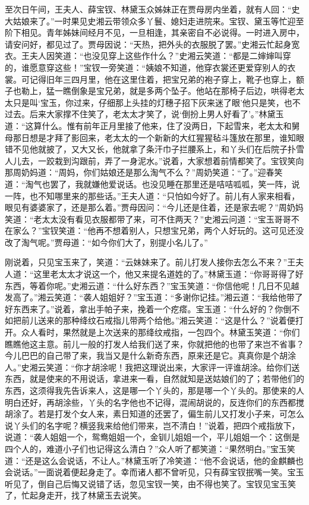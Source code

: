 \documentclass[12pt,oneside]{book}
\begin{document}
至次日午间，王夫人、薛宝钗、林黛玉众姊妹正在贾母房内坐着，就有人回：“史大姑娘来了。”一时果见史湘云带领众多丫鬟、媳妇走进院来。宝钗、黛玉等忙迎至阶下相见。青年姊妹间经月不见，一旦相逢，其亲密自不必说得。一时进入房中，请安问好，都见过了。贾母因说：“天热，把外头的衣服脱了罢。”史湘云忙起身宽衣。王夫人因笑道：“也没见穿上这些作什么？”史湘云笑道：“都是二婶婶叫穿的，谁愿意穿这些！”宝钗一旁笑道：“姨娘不知道，他穿衣裳还更爱穿别人的衣裳。可记得旧年三四月里，他在这里住着，把宝兄弟的袍子穿上，靴子也穿上，额子也勒上，猛一瞧倒象是宝兄弟，就是多两个坠子。他站在那椅子后边，哄得老太太只是叫‘宝玉，你过来，仔细那上头挂的灯穗子招下灰来迷了眼’他只是笑，也不过去。后来大家撑不住笑了，老太太才笑了，说‘倒扮上男人好看了’。”林黛玉道：“这算什么。惟有前年正月里接了他来，住了没两日，下起雪来，老太太和舅母那日想是才拜了影回来，老太太的一个新新的大红猩猩毡斗篷放在那里，谁知眼错不见他就披了，又大又长，他就拿了条汗巾子拦腰系上，和丫头们在后院子扑雪人儿去，一跤栽到沟跟前，弄了一身泥水。”说着，大家想着前情都笑了。宝钗笑向那周奶妈道：“周妈，你们姑娘还是那么淘气不么？”周奶笑道：“了。”迎春笑道：“淘气也罢了，我就嫌他爱说话。也没见睡在那里还是咭咭呱呱，笑一阵，说一阵，也不知哪里来的那些话。”王夫人道：“只怕如今好了。前儿有人家来相看，眼见有婆婆家了，还是那么着。”贾母因问：“今儿还是住着，还是家去呢？”周奶妈笑道：“老太太没有看见衣服都带了来，可不住两天？”史湘云问道：“宝玉哥哥不在家么？”宝钗笑道：“他再不想着别人，只想宝兄弟，两个人好玩的。这可见还没改了淘气呢。”贾母道：“如今你们大了，别提小名儿了。”

刚说着，只见宝玉来了，笑道：“云妹妹来了。前儿打发人接你去怎么不来？”王夫人道：“这里老太太才说这一个，他又来提名道姓的了。”林黛玉道：“你哥哥得了好东西，等着你呢。”史湘云道：“什么好东西？”宝玉笑道：“你信他呢！几日不见越发高了。”湘云笑道：“袭人姐姐好？”宝玉道：“多谢你记挂。”湘云道：“我给他带了好东西来了。”说着，拿出手帕子来，挽着一个疙瘩。宝玉道：“什么好的？你倒不如把前儿送来的那种绛纹石戒指儿带两个给他。”湘云笑道：“这是什么？”说着便打开。众人看时，果然就是上次送来的那绛纹戒指，一包四个。林黛玉笑道：“你们瞧瞧他这主意。前儿一般的打发人给我们送了来，你就把他的也带了来岂不省事？今儿巴巴的自己带了来，我当又是什么新奇东西，原来还是它。真真你是个胡涂人。”史湘云笑道：“你才胡涂呢！我把这理说出来，大家评一评谁胡涂。给你们送东西，就是使来的不用说话，拿进来一看，自然就知是送姑娘们的了；若带他们的东西，这须得我先告诉来人，这是哪一个丫头的，那是哪一个丫头的。那使来的人明白还好，再胡涂些，丫头的名字他也不记得，混闹胡说的，反连你们的东西都搅胡涂了。若是打发个女人来，素日知道的还罢了，偏生前儿又打发小子来，可怎么说丫头们的名字呢？横竖我来给他们带来，岂不清白！”说着，把四个戒指放下，说道：“袭人姐姐一个，鸳鸯姐姐一个，金钏儿姐姐一个，平儿姐姐一个：这倒是四个人的，难道小子们也记得这么清白？”众人听了都笑道：“果然明白。”宝玉笑道：“还是这么会说话，不让人。”林黛玉听了冷笑道：“他不会说话，他的金麒麟也会说话。”一面说着便起身走了。幸而诸人都不曾听见，只有薛宝钗抿嘴一笑。宝玉听见了，倒自己后悔又说错了话，忽见宝钗一笑，由不得也笑了。宝钗见宝玉笑了，忙起身走开，找了林黛玉去说笑。
\end{document}
